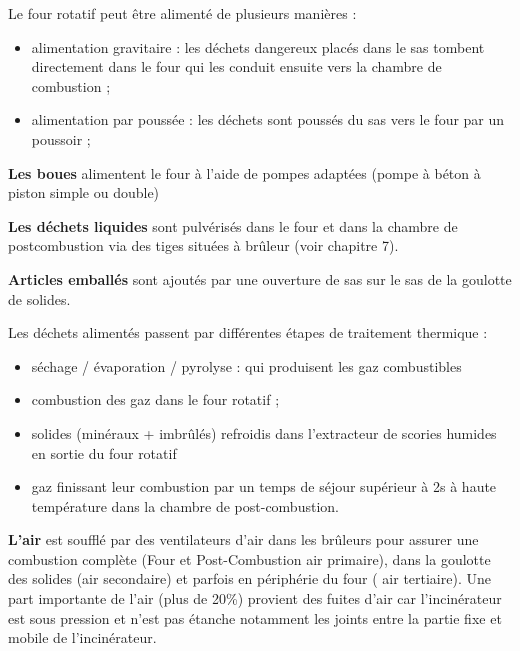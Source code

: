 Le four rotatif peut être alimenté de plusieurs manières :
\begin{itemize}
\item alimentation gravitaire : les déchets dangereux placés dans le sas tombent directement dans le four qui les conduit ensuite vers la chambre de combustion ;
\item alimentation par poussée : les déchets sont poussés du sas vers le four par un poussoir ;
\end{itemize}



\vspace{0.3cm}
\textbf{Les boues} alimentent le four à l'aide de pompes adaptées (pompe à béton à piston simple ou double)

\vspace{0.3cm}
\textbf{Les déchets liquides} sont pulvérisés dans le four et dans la chambre de postcombustion via des tiges situées à brûleur (voir chapitre 7).

\newpage
\vspace{0.3cm}
\textbf{Articles emballés} sont ajoutés par une ouverture de sas sur le sas de la goulotte de solides.


Les déchets alimentés passent par différentes étapes de traitement thermique :
\begin{itemize}
\item séchage / évaporation / pyrolyse : qui produisent les gaz combustibles
\item combustion des gaz dans le four rotatif ;
\item solides (minéraux + imbrûlés) refroidis dans l'extracteur de scories humides en sortie du four rotatif
\item gaz finissant leur combustion par un temps de séjour supérieur à 2s à haute température dans la chambre de post-combustion.
\end{itemize} 

\vspace{0.3cm}
\textbf{L'air} est soufflé par des ventilateurs d'air dans les brûleurs pour assurer une combustion complète (Four et Post-Combustion air primaire), dans la goulotte des solides (air secondaire) et parfois en périphérie du four ( air tertiaire). Une part importante de l'air (plus de 20\%) provient des fuites d'air car l'incinérateur est sous pression et n'est pas étanche notamment les joints entre la partie fixe et mobile de l'incinérateur.
\vspace{0.3cm}


